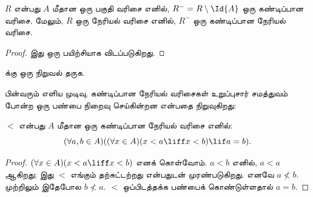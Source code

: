 \documentclass[../../../include/open-logic-section]{subfiles}
\begin{document}
\begin{prop}
$R$ என்பது $A$ மீதான ஒரு பகுதி வரிசை எனில்,
$R^- = R \setminus \Id{A}$ ஒரு கண்டிப்பான வரிசை. மேலும், $R$ ஒரு
நேரியல் வரிசை எனில், $R^-$ ஒரு கண்டிப்பான நேரியல் வரிசை.
\end{prop}

\begin{proof}
இது ஒரு பயிற்சியாக விடப்படுகிறது.
\end{proof}

\begin{prob}
 க்கு ஒரு நிறுவல் தருக.
\end{prob}

பின்வரும் எளிய முடிவு, கண்டிப்பான நேரியல் வரிசைகள் உறுப்புசார் சமத்துவம்
போன்ற ஒரு பண்பை நிறைவு செய்கின்றன என்பதை நிறுவுகிறது:

\begin{prop}
$<$ என்பது $A$ மீதான ஒரு கண்டிப்பான நேரியல் வரிசை எனில்:
\[
  (\forall a, b \in A)((\forall x \in A)(x < a \liff x < b) \lif a = b).
\]
\end{prop}

\begin{proof}
$(\forall x \in A)(x < a \liff x < b)$ எனக் கொள்வோம். $a < b$ எனில்,
$a < a$ ஆகிறது; இது $<$ எங்கும் தற்சுட்டற்றது என்பதுடன் முரண்படுகிறது.
எனவே $a \nless b$. முற்றிலும் இதேபோல $b \nless a$.
$<$ ஒப்பிடத்தக்க பண்பைக் கொண்டுள்ளதால் $a = b$.
\end{proof}
\end{document}
